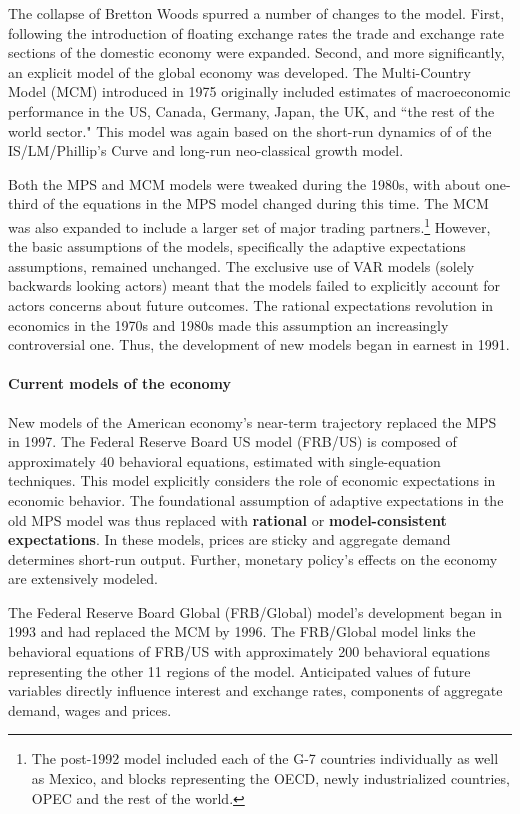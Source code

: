 \documentclass[a4paper]{article}\usepackage{graphicx, color}
\begin{document}
The collapse of Bretton Woods spurred a number of changes to the model. First, following the introduction of floating exchange rates the trade and exchange rate sections of the domestic economy were expanded. Second, and more significantly, an explicit model of the global economy was developed. The Multi-Country Model (MCM) introduced in 1975 originally included estimates of macroeconomic performance in the US, Canada, Germany, Japan, the UK, and ``the rest of the world sector." This model was again based on the short-run dynamics of of the IS/LM/Phillip's Curve and long-run neo-classical growth model.

Both the MPS and MCM models were tweaked during the 1980s, with about one-third of the equations in the MPS model changed during this time. The MCM was also expanded to include a larger set of major trading partners.\footnote{The post-1992 model included each of the G-7 countries individually as well as Mexico, and blocks representing the OECD, newly industrialized countries, OPEC and the rest of the world.} However, the basic assumptions of the models, specifically the adaptive expectations assumptions, remained unchanged. The exclusive use of VAR models (solely backwards looking actors) meant that the models failed to explicitly account for actors concerns about future outcomes. The rational expectations revolution in economics in the 1970s and 1980s made this assumption an increasingly controversial one. Thus, the development of new models began in earnest in 1991.
 
\paragraph{Current models of the economy}
New models of the American economy's near-term trajectory replaced the MPS in 1997. The Federal Reserve Board US model (FRB/US) is composed of approximately 40 behavioral equations, estimated with single-equation techniques. This model explicitly considers the role of economic expectations in economic behavior. The foundational assumption of adaptive expectations in the old MPS model was thus replaced with {\bf{rational}} or {\bf{model-consistent expectations}}. In these models, prices are sticky and aggregate demand determines short-run output. Further, monetary policy's effects on the economy are extensively modeled. 

The Federal Reserve Board Global (FRB/Global) model's development began in 1993 and had replaced the MCM by 1996. The FRB/Global model links the behavioral equations of FRB/US with approximately 200 behavioral equations representing the other 11 regions of the model. Anticipated values of future variables directly influence interest and exchange rates, components of aggregate demand, wages and prices.
\end{document}
